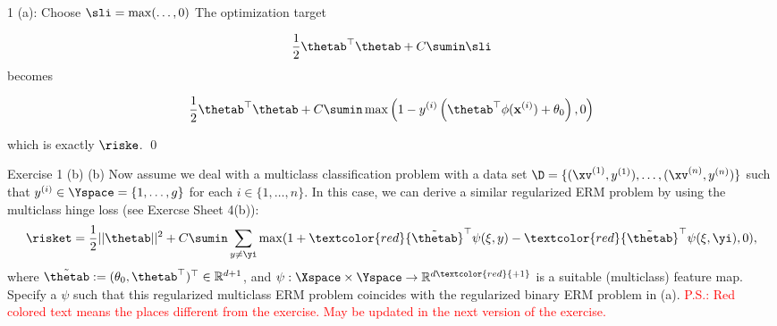 \documentclass[aspectratio=169]{beamer}
\newcommand{\thetabt}{\tilde{\thetab}}
\begin{document}
\begin{frame}{1 (a): Choose $\sli = \max(\ldots, 0) $ }
The optimization target 

$$
\frac{1}{2} \thetab^\top \thetab + C \sumin \sli
$$
becomes 

$$
\frac{1}{2} \thetab^\top \thetab + C \sumin \max\left(1 - y^{(i)} \left(\thetab^\top \phi(\mathbf{x}^{(i)}) + \theta_0 \right), 0 \right)
$$

which is exactly $\riske$. \qed
\end{frame}


\begin{frame}{Exercise 1 (b)}
	(b) Now assume we deal with a multiclass classification problem with a data set $\D = \{(\xv^{(1)}, y^{(1)}), \ldots, (\xv^{(n)}, y^{(n)})\}$ such that $y^{(i)} \in \Yspace = \{1, \ldots, g \}$ for each $i \in \{1, \ldots, n \}$. In this case, we can derive a similar regularized ERM problem by using the multiclass hinge loss (see Exercse Sheet 4(b)):
	$$\risket = \frac{1}{2} || \thetab||^2 + C \sumin \sum_{y\neq \yi} \max (1 + \textcolor{red}{\thetabt}^\top \psi (\xi, y) - \textcolor{red}{\thetabt}^\top \psi(\xi, \yi), 0), $$
	where \textcolor{red}{$\thetabt := (\theta_0, \thetab^\top)^\top \in \mathbb{R}^{d + 1}$}, and $\psi: \Xspace \times \Yspace \to \mathbb{R}^{d \textcolor{red}{+1}}$ is a suitable (multiclass) feature map. Specify a $\psi$ such that this regularized multiclass ERM problem coincides with the regularized binary ERM problem in (a). \textcolor{red}{P.S.: Red colored text means the places different from the exercise. May be updated in the next version of the exercise.}
\end{frame}
\end{document}
